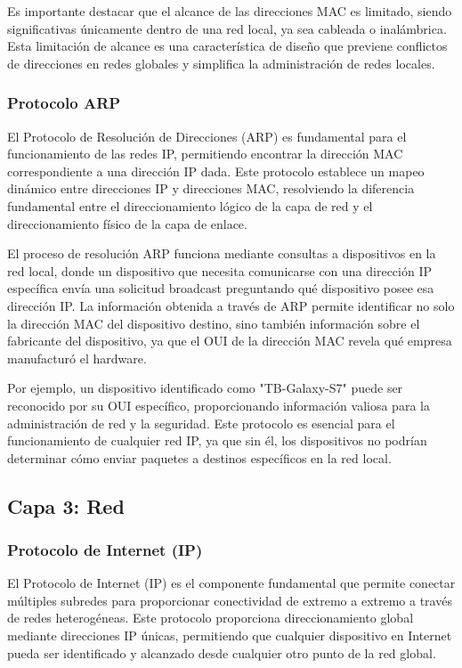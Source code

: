 Es importante destacar que el alcance de las direcciones MAC es limitado, siendo significativas únicamente dentro de una red local, ya sea cableada o inalámbrica. Esta limitación de alcance es una característica de diseño que previene conflictos de direcciones en redes globales y simplifica la administración de redes locales.

\subsubsection{Protocolo ARP}

El Protocolo de Resolución de Direcciones (ARP) es fundamental para el funcionamiento de las redes IP, permitiendo encontrar la dirección MAC correspondiente a una dirección IP dada. Este protocolo establece un mapeo dinámico entre direcciones IP y direcciones MAC, resolviendo la diferencia fundamental entre el direccionamiento lógico de la capa de red y el direccionamiento físico de la capa de enlace.

El proceso de resolución ARP funciona mediante consultas a dispositivos en la red local, donde un dispositivo que necesita comunicarse con una dirección IP específica envía una solicitud broadcast preguntando qué dispositivo posee esa dirección IP. La información obtenida a través de ARP permite identificar no solo la dirección MAC del dispositivo destino, sino también información sobre el fabricante del dispositivo, ya que el OUI de la dirección MAC revela qué empresa manufacturó el hardware.

Por ejemplo, un dispositivo identificado como "TB-Galaxy-S7" puede ser reconocido por su OUI específico, proporcionando información valiosa para la administración de red y la seguridad. Este protocolo es esencial para el funcionamiento de cualquier red IP, ya que sin él, los dispositivos no podrían determinar cómo enviar paquetes a destinos específicos en la red local.

\subsection{Capa 3: Red}

\subsubsection{Protocolo de Internet (IP)}

El Protocolo de Internet (IP) es el componente fundamental que permite conectar múltiples subredes para proporcionar conectividad de extremo a extremo a través de redes heterogéneas. Este protocolo proporciona direccionamiento global mediante direcciones IP únicas, permitiendo que cualquier dispositivo en Internet pueda ser identificado y alcanzado desde cualquier otro punto de la red global.

